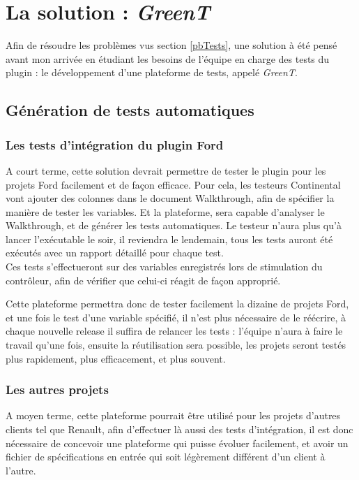 	\section{La solution : \textit{\textit{GreenT}}}
	Afin de résoudre les problèmes vus section \ref{pbTests}, une solution à été pensé avant mon arrivée en étudiant les besoins de l'équipe en charge des tests du plugin : le développement d'une plateforme de tests, appelé \textit{GreenT}.

	\subsection{Génération de tests automatiques}
	\subsubsection{Les tests d'intégration du plugin Ford}
	A court terme, cette solution devrait permettre de tester le plugin pour les projets Ford facilement et de façon efficace. Pour cela, les testeurs Continental vont ajouter des colonnes dans le document Walkthrough, afin de spécifier la manière de tester les variables. Et la plateforme, sera capable d'analyser le Walkthrough, et de générer les tests automatiques. Le testeur n'aura plus qu'à lancer l'exécutable le soir, il reviendra le lendemain, tous les tests auront été exécutés avec un rapport détaillé pour chaque test.\\

	Ces tests s'effectueront sur des variables enregistrés lors de stimulation du contrôleur, afin de vérifier que celui-ci réagit de façon approprié.

	Cette plateforme permettra donc de tester facilement la dizaine de projets Ford, et une fois le test d'une variable spécifié, il n'est plus nécessaire de le réécrire, à chaque nouvelle release il suffira de relancer les tests : l'équipe n'aura à faire le travail qu'une fois, ensuite la réutilisation sera possible, les projets seront testés plus rapidement, plus efficacement, et plus souvent.

	\subsubsection{Les autres projets}
	A moyen terme, cette plateforme pourrait être utilisé pour les projets d'autres clients tel que Renault, afin d'effectuer là aussi des tests d'intégration, il est donc nécessaire de concevoir une plateforme qui puisse évoluer facilement, et avoir un fichier de spécifications en entrée qui soit légèrement différent d'un client à l'autre.

